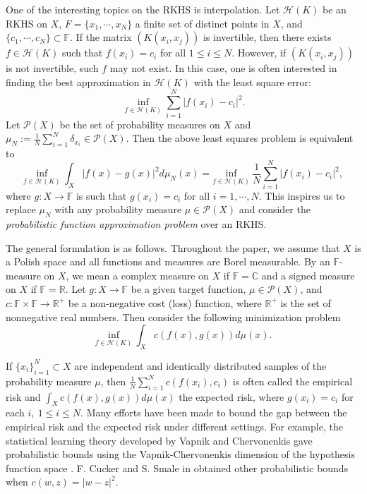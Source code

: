 \documentclass{amsart}
\numberwithin{equation}{section}
\theoremstyle{plain}
\theoremstyle{remark}
\theoremstyle{definition}
\begin{document}
One of the interesting topics on the RKHS is interpolation. 
Let $\mathscr{H}(K)$ be an RKHS on $X$, $F= \{x_1,\cdots, x_N\}$ a finite set of distinct points in $X$, and $\{c_1, \cdots, c_N\} \subset \mathbb{F}$. 
If the matrix $(K(x_i, x_j))$ is invertible, then there exists $ f\in \mathscr{H}(K)$ such that $f(x_i) = c_i$ for all $1 \leq i \leq N$. 
However, if $(K(x_i, x_j))$ is not invertible, such $f$ may not exist. 
In this case, one is often interested in finding the best approximation in $\mathscr{H}(K)$ with the least square error:
$$\underset{f \in \mathscr{H}(K)}{\inf} \sum\limits_{i=1}^N \vert f(x_i) - c_i \vert ^2.$$
Let $\mathscr{P}(X)$ be the set of probability measures on $X$ and $\mu_N := \frac{1}{N} \sum\limits_{i=1}^N \delta_{x_i} \in \mathscr{P}(X)$.
Then the above least squares problem is equivalent to 
\begin{equation*}
    \underset{f \in \mathscr{H}(K)}{\text{inf}} \ \int_{X} \vert f(x) - g(x) \vert ^2 d\mu_N(x) = \underset{f \in \mathscr{H}(K)}{\text{inf}} \ \frac{1}{N} \sum_{i=1}^N \vert f(x_i) - c_i \vert ^2,
\end{equation*}
where $g: X \rightarrow \mathbb{F}$ is such that $g(x_i) = c_i$ for all $i=1, \cdots, N$.
This inspires us to replace $\mu_N$ with any probability measure $\mu  \in \mathscr{P}(X)$ and consider the \textit{probabilistic function approximation problem} over an RKHS.  

The general formulation is as follows. 
Throughout the paper, we assume that $X$ is a Polish space and all functions and measures are Borel measurable. By an $\mathbb{F}$-measure on $X$, we mean  a complex measure on $X$ if $\mathbb{F}=\mathbb{C}$ and a signed measure on $X$ if $\mathbb{F}=\mathbb{R}$. 
Let $g:X \rightarrow \mathbb{F}$ be a given target function, $\mu \in \mathscr{P}(X)$, and $c:\mathbb{F} \times \mathbb{F} \rightarrow \mathbb{R}^{+}$ be a non-negative cost (loss) function, where $\mathbb{R}^{+}$ is the set of nonnegative real numbers. 
Then consider the following minimization problem
\begin{equation}\label{muCostFunction}
    \underset{f \in \mathscr{H}(K)}{\text{inf}} \ \int_{X} c( f(x), g(x)) d\mu(x).
\end{equation}

If $\{x_i\}_{i=1}^N \subset X$ are independent and identically distributed samples of the probability measure $\mu$, then $\frac{1}{N}\sum\limits_{i=1}^N c( f(x_i), c_i)$ is often called the empirical risk and $\int_{X} c(f(x), g(x)) d\mu(x)$ the expected risk, where $g(x_i) = c_i$ for each $i, \ 1 \leq i \leq N$. Many efforts have been made to bound the gap between the empirical risk and the expected risk under different settings. For example, the statistical learning theory developed by Vapnik and Chervonenkis gave probabilistic bounds using the Vapnik-Chervonenkis dimension of the hypothesis function space \cite{vapnik1998statistical, vapnik2013nature, vapnik1974theory}. F. Cucker and S. Smale in \cite{cucker2002mathematical} obtained other probabilistic bounds when $c(w, z) = |w-z|^2$. 
\end{document}

